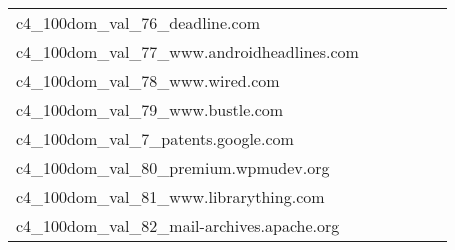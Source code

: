 {\begin{longtable}{m{6cm}m{1.7cm}m{1.7cm}m{1.7cm}m{1.7cm}m{1.7cm}}
	c4\_100dom\_val\_76\_deadline.com  & \colorbox[HTML]{ffffe5}{\makebox[\mywidth][c]{14.75}} & \colorbox[HTML]{e3f4aa}{\makebox[\mywidth][c]{13.83}} & \colorbox[HTML]{ffffe5}{\makebox[\mywidth][c]{15.48}} & \colorbox[HTML]{f0f9b4}{\makebox[\mywidth][c]{13.92}} & \colorbox[HTML]{77c578}{\makebox[\mywidth][c]{13.51}}\\
	c4\_100dom\_val\_77\_www.androidheadlines.com  & \colorbox[HTML]{fefee3}{\makebox[\mywidth][c]{11.11}} & \colorbox[HTML]{e7f5ad}{\makebox[\mywidth][c]{10.74}} & \colorbox[HTML]{ffffe5}{\makebox[\mywidth][c]{11.43}} & \colorbox[HTML]{e0f2a8}{\makebox[\mywidth][c]{10.72}} & \colorbox[HTML]{77c578}{\makebox[\mywidth][c]{10.59}}\\
	c4\_100dom\_val\_78\_www.wired.com  & \colorbox[HTML]{fefee0}{\makebox[\mywidth][c]{14.42}} & \colorbox[HTML]{daf0a4}{\makebox[\mywidth][c]{13.88}} & \colorbox[HTML]{ffffe5}{\makebox[\mywidth][c]{15.14}} & \colorbox[HTML]{d9f0a3}{\makebox[\mywidth][c]{13.87}} & \colorbox[HTML]{77c578}{\makebox[\mywidth][c]{13.68}}\\
	c4\_100dom\_val\_79\_www.bustle.com  & \colorbox[HTML]{ffffe5}{\makebox[\mywidth][c]{12.79}} & \colorbox[HTML]{f3fab6}{\makebox[\mywidth][c]{12.33}} & \colorbox[HTML]{ffffe5}{\makebox[\mywidth][c]{13.19}} & \colorbox[HTML]{dff2a7}{\makebox[\mywidth][c]{12.25}} & \colorbox[HTML]{77c578}{\makebox[\mywidth][c]{12.09}}\\
	c4\_100dom\_val\_7\_patents.google.com  & \colorbox[HTML]{77c578}{\makebox[\mywidth][c]{7.59}} & \colorbox[HTML]{dff2a7}{\makebox[\mywidth][c]{7.84}} & \colorbox[HTML]{ffffe5}{\makebox[\mywidth][c]{9.33}} & \colorbox[HTML]{bbe395}{\makebox[\mywidth][c]{7.72}} & \colorbox[HTML]{7ac779}{\makebox[\mywidth][c]{7.59}}\\
	c4\_100dom\_val\_80\_premium.wpmudev.org  & \colorbox[HTML]{f9fdc9}{\makebox[\mywidth][c]{16.86}} & \colorbox[HTML]{eaf7af}{\makebox[\mywidth][c]{16.63}} & \colorbox[HTML]{ffffe5}{\makebox[\mywidth][c]{18.13}} & \colorbox[HTML]{d0ec9e}{\makebox[\mywidth][c]{16.50}} & \colorbox[HTML]{77c578}{\makebox[\mywidth][c]{16.29}}\\
	c4\_100dom\_val\_81\_www.librarything.com  & \colorbox[HTML]{fbfdd4}{\makebox[\mywidth][c]{14.36}} & \colorbox[HTML]{ddf1a6}{\makebox[\mywidth][c]{13.98}} & \colorbox[HTML]{ffffe5}{\makebox[\mywidth][c]{15.42}} & \colorbox[HTML]{c9e99b}{\makebox[\mywidth][c]{13.91}} & \colorbox[HTML]{77c578}{\makebox[\mywidth][c]{13.75}}\\
	c4\_100dom\_val\_82\_mail-archives.apache.org  & \colorbox[HTML]{f8fcc2}{\makebox[\mywidth][c]{5.67}} & \colorbox[HTML]{e8f6ae}{\makebox[\mywidth][c]{5.61}} & \colorbox[HTML]{ffffe5}{\makebox[\mywidth][c]{6.17}} & \colorbox[HTML]{cae99c}{\makebox[\mywidth][c]{5.56}} & \colorbox[HTML]{77c578}{\makebox[\mywidth][c]{5.49}}\\

\end{longtable}}
